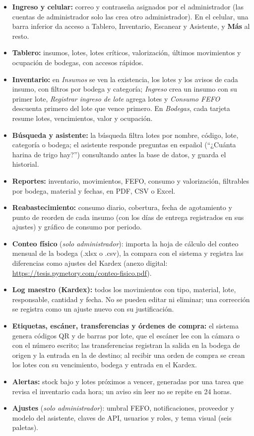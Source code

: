 \begin{itemize}
	\item \textbf{Ingreso y celular:} correo y contraseña asignados por el administrador (las cuentas de administrador solo las crea otro administrador). En el celular, una barra inferior da acceso a Tablero, Inventario, Escanear y Asistente, y \textbf{Más} al resto.
	\item \textbf{Tablero:} insumos, lotes, lotes críticos, valorización, últimos movimientos y ocupación de bodegas, con accesos rápidos.
	\item \textbf{Inventario:} en \textit{Insumos} se ven la existencia, los lotes y los avisos de cada insumo, con filtros por bodega y categoría; \textit{Ingreso} crea un insumo con su primer lote, \textit{Registrar ingreso de lote} agrega lotes y \textit{Consumo FEFO} descuenta primero del lote que vence primero. En \textit{Bodegas}, cada tarjeta resume lotes, vencimientos, valor y ocupación.
	\item \textbf{Búsqueda y asistente:} la búsqueda filtra lotes por nombre, código, lote, categoría o bodega; el asistente responde preguntas en español (``¿Cuánta harina de trigo hay?'') consultando antes la base de datos, y guarda el historial.
	\item \textbf{Reportes:} inventario, movimientos, FEFO, consumo y valorización, filtrables por bodega, material y fechas, en PDF, CSV o Excel.
	\item \textbf{Reabastecimiento:} consumo diario, cobertura, fecha de agotamiento y punto de reorden de cada insumo (con los días de entrega registrados en sus ajustes) y gráfico de consumo por periodo.
	\item \textbf{Conteo físico} (\textit{solo administrador}): importa la hoja de cálculo del conteo mensual de la bodega (.xlsx o .csv), la compara con el sistema y registra las diferencias como ajustes del Kardex (anexo digital: \url{https://tesis.pymetory.com/conteo-fisico.pdf}).
	\item \textbf{Log maestro (Kardex):} todos los movimientos con tipo, material, lote, responsable, cantidad y fecha. No se pueden editar ni eliminar; una corrección se registra como un ajuste nuevo con su justificación.
	\item \textbf{Etiquetas, escáner, transferencias y órdenes de compra:} el sistema genera códigos QR y de barras por lote, que el escáner lee con la cámara o con el número escrito; las transferencias registran la salida en la bodega de origen y la entrada en la de destino; al recibir una orden de compra se crean los lotes con su vencimiento, bodega y entrada en el Kardex.
	\item \textbf{Alertas:} stock bajo y lotes próximos a vencer, generadas por una tarea que revisa el inventario cada hora; un aviso sin leer no se repite en 24 horas.
	\item \textbf{Ajustes} (\textit{solo administrador}): umbral FEFO, notificaciones, proveedor y modelo del asistente, claves de API, usuarios y roles, y tema visual (seis paletas).
\end{itemize}
